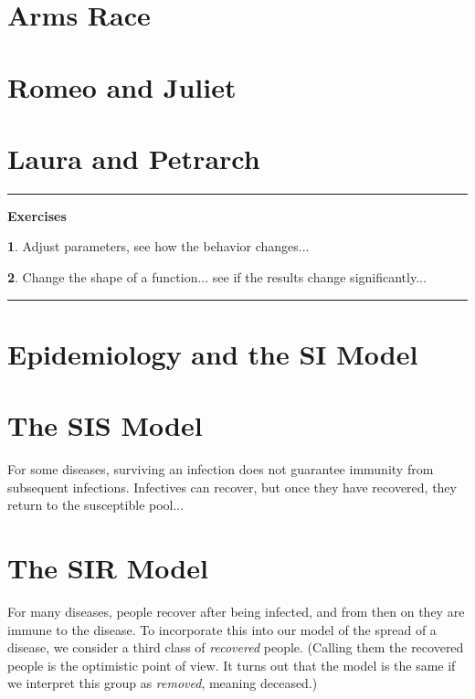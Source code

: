 \documentclass[reqno]{immbook}
\numberwithin{equation}{chapter}
\numberwithin{question}{section}
\numberwithin{theorem}{chapter}
\numberwithin{figure}{chapter}
\theoremstyle{definition}
\newtheorem{exercise}{}[section]
\newenvironment{exercises}%
{%
\medskip\hrule\medskip\noindent\textbf{Exercises}%
}%
{%
\medskip\hrule
}
\begin{document}
\section{Arms Race}
%
\section{Romeo and Juliet}
\section{Laura and Petrarch}

\begin{exercises}
\begin{exercise}
Adjust parameters, see how the behavior changes...
\end{exercise}
\begin{exercise}
Change the shape of a function... see if the results change
significantly...
\end{exercise}
\end{exercises}

\newpage

\section{Epidemiology and the SI Model}


\section{The SIS Model}
%
%
For some diseases, surviving an infection
does not guarantee immunity from subsequent infections.
Infectives can recover,
but once they have recovered, they return to the
susceptible pool... 


\section{The SIR Model}
For many diseases, people recover after being infected,
and from then on they are immune to the disease.
To incorporate this into our model of the spread of
a disease, we consider a third class of \emph{recovered}
people. (Calling them the recovered people is the
optimistic point of view.  It turns out that the
model is the same if we interpret this group as
\emph{removed}, meaning deceased.)
\end{document}
